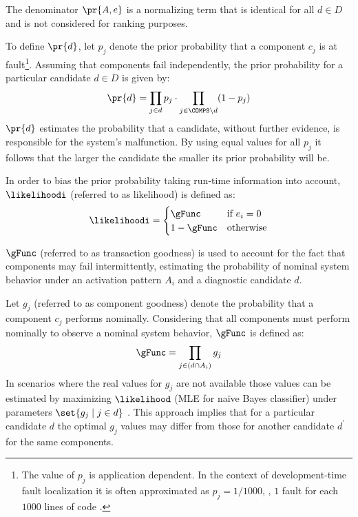 %
The denominator $\pr{A, e}$ is a normalizing term that is identical
for all $d \in D$ and is not considered for ranking purposes.

To define $\pr{d}$, let $p_j$ denote the prior probability that a
component $c_j$ is at fault\footnote{The value of $p_j$ is application
  dependent. In the context of development-time fault localization it
  is often approximated as $p_j = 1/1000$, \ie, $1$ fault for each
  $1000$ lines of code \citep{Carey99}.}.
%
Assuming that components fail independently, the prior
probability for a particular candidate $d \in D$ is given by:
\begin{equation}
  \pr{d} = \prod_{j \in d} p_j \cdot \prod_{j \in \COMPS \setminus d} (1 - p_j)
\end{equation}
%
$\pr{d}$ estimates the probability that a candidate, without further
evidence, is responsible for the system's malfunction.
%
By using equal values for all $p_j$
it follows that the larger the candidate the smaller its prior
probability will be.


In order to bias the prior probability taking run-time information
into account, $\likelihoodi$ (referred to as likelihood) is
defined as:
\begin{equation}
  \label{eq:intro:likelihood-func}
  \likelihoodi =
  \begin{cases}
    \gFunc     & \textrm{if   } e_i = 0 \\
    1 - \gFunc & \textrm{otherwise}
  \end{cases}
\end{equation}

\noindent $\gFunc$ (referred to as transaction goodness) is used to
account for the fact that components may fail intermittently,
estimating the probability of nominal system behavior under an
activation pattern $A_i$ and a diagnostic candidate $d$.


Let $g_j$ (referred to as component goodness) denote the probability
that a component $c_j$ performs nominally.
%
Considering that all components must perform nominally to observe a
nominal system behavior, $\gFunc$ is defined as:
\begin{equation}
  \label{eq:intro:g-func}
  \gFunc = \displaystyle\prod_{j \in (d \cap A_i)} g_j
\end{equation}
\noindent In scenarios where the real values for $g_j$ are not
available those values can be estimated by maximizing $\likelihood$
(\ac{MLE} for na\"{i}ve Bayes classifier) under parameters
$\set{ g_j \mid j \in d }$ \citep{Abreu09a}.
%
This approach implies that for a particular candidate $d$ the optimal
$g_j$ values may differ from those for another candidate $d^\prime$
for the same components.

